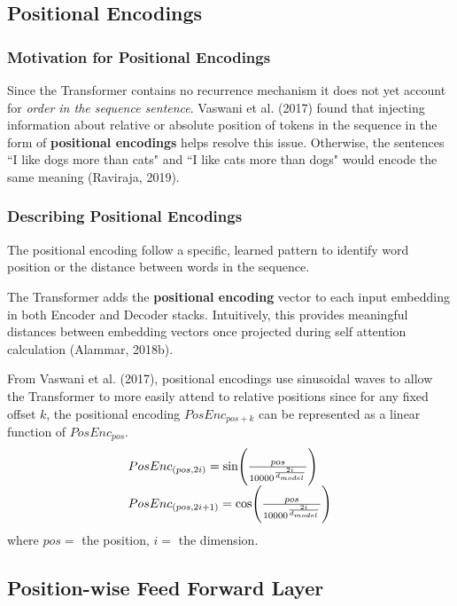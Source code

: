 \subsection{Positional Encodings}

\subsubsection{Motivation for Positional Encodings}

Since the Transformer contains no recurrence mechanism it does not yet account for \emph{order in the sequence sentence}. Vaswani et al. (2017) found that injecting information about relative or absolute position of tokens in the sequence in the form of \textbf{positional encodings} helps resolve this issue. 
Otherwise, the sentences ``I like dogs more than cats" and ``I like cats more than dogs" would encode the same meaning (Raviraja, 2019). 

\subsubsection{Describing Positional Encodings}

The positional encoding follow a specific, learned pattern to identify word position or the distance between words in the sequence. 

The Transformer adds the \textbf{positional encoding} vector to each input embedding in both Encoder and Decoder stacks. Intuitively, this provides meaningful distances between embedding vectors once projected during self attention calculation (Alammar, 2018b). 

From Vaswani et al. (2017), positional encodings use sinusoidal waves to allow the Transformer to more easily attend to relative positions since for any fixed offset $k$, the positional encoding $PosEnc_{pos + k}$ can be represented as a linear function of $PosEnc_{pos}$.
$$
\begin{array}{ll}
PosEnc_{\Large (pos, 2i)} = \text{sin} \Bigg(\frac {pos} {10000^{\Large \frac {2i} {d_{model}} } }  \Bigg) \\
PosEnc_{\Large (pos, 2i + 1)} = \text{cos} \Bigg(\frac {pos} {10000^{\Large \frac {2i} {d_{model}} } }  \Bigg)
\end{array}
$$
where $pos = $ the position, $i = $ the dimension.


\subsection{Position-wise Feed Forward Layer}


